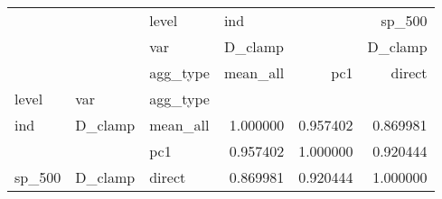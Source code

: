 \begin{tabular}{lllrrr}
\toprule
       &         & level & \multicolumn{2}{l}{ind} &    sp\_500 \\
       &         & var & \multicolumn{2}{l}{D\_clamp} &   D\_clamp \\
       &         & agg\_type &  mean\_all &       pc1 &    direct \\
level & var & agg\_type &           &           &           \\
\midrule
ind & D\_clamp & mean\_all &  1.000000 &  0.957402 &  0.869981 \\
       &         & pc1 &  0.957402 &  1.000000 &  0.920444 \\
sp\_500 & D\_clamp & direct &  0.869981 &  0.920444 &  1.000000 \\
\bottomrule
\end{tabular}
